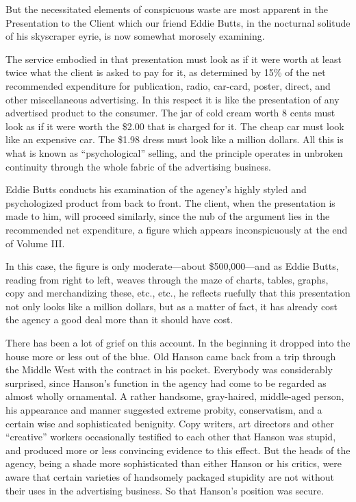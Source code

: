 \documentclass[openany,nobib]{tufte-book}
\begin{document}
But the necessitated elements of conspicuous waste are most apparent in
the Presentation to the Client which our friend Eddie Butts, in the
nocturnal solitude of his skyscraper eyrie, is now somewhat morosely
examining.

The service embodied in that presentation must look as if it were worth
at least twice what the client is asked to pay for it, as determined by
15\% of the net recommended expenditure for publication, radio,
car-card, poster, direct, and other miscellaneous advertising. In this
respect it is like the presentation of any advertised product to the
consumer. The jar of cold cream worth 8 cents must look as if it were
worth the \$2.00 that is charged for it. The cheap car must look like an
expensive car. The \$1.98 dress must look like a million dollars. All
this is what is known as ``psychological'' selling, and the principle
operates in unbroken continuity through the whole fabric of the
advertising business.

Eddie Butts conducts his examination of the agency's highly styled and
psychologized product from back to front. The client, when the
presentation is made to him, will proceed similarly, since the nub of
the argument lies in the recommended net expenditure, a figure which
appears inconspicuously at the end of Volume III.

In this case, the figure is only moderate---about \$500,000---and as
Eddie Butts, reading from right to left, weaves through the maze of
charts, tables, graphs, copy and merchandizing these, etc., etc., he
reflects ruefully that this presentation not only looks like a million
dollars, but as a matter of fact, it has already cost the agency a good
deal more than it should have cost.

There has been a lot of grief on this account. In the beginning it
dropped into the house more or less out of the blue. Old Hanson came
back from a trip through the Middle West with the contract in his
pocket. Everybody was considerably surprised, since Hanson's function in
the agency had come to be regarded as almost wholly ornamental. A rather
handsome, gray-haired, middle-aged person, his appearance and manner
suggested extreme probity, conservatism, and a certain wise and
sophisticated benignity. Copy writers, art directors and other
``creative'' workers occasionally testified to each other that Hanson
was stupid, and produced more or less convincing evidence to this
effect. But the heads of the agency, being a shade more sophisticated
than either Hanson or his critics, were aware that certain varieties of
handsomely packaged stupidity are not without their uses in the
advertising business. So that Hanson's position was secure.
\end{document}
